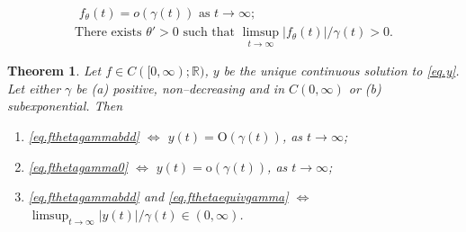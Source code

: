 \documentclass[a4paper,10pt,reqno]{amsart}
\numberwithin{equation}{section}
\newtheorem{theorem}{Theorem}
\theoremstyle{definition}
\theoremstyle{remark}
\DeclareMathOperator{\1}{\mathbbm 1}
\begin{document}
	\begin{gather} 
		\label{eq.fthetagamma0}
		\text{
			$f_\theta(t)=o(\gamma(t))$ as $t\to\infty$}; \\
		\label{eq.fthetaequivgamma}
		\text{There exists $\theta'>0$ such that $\limsup_{t\to\infty} |f_\theta(t)|/\gamma(t)>0$}.
	\end{gather} 
	\begin{theorem} \label{lemma.fthetaymonotone}
		Let $f\in C([0,\infty);\mathbb{R})$, $y$ be the unique continuous solution to \eqref{eq.y}. 
		Let either $\gamma$ be (a)  positive, non--decreasing and in $C(0,\infty)$ or (b) subexponential. Then 
		\begin{enumerate}
			\item[(i)] \eqref{eq.fthetagammabdd} $\Longleftrightarrow$ 
			$y(t)=\text{O}(\gamma(t))$, as $t\to\infty$;	
			\item[(ii)] \eqref{eq.fthetagamma0} $\Longleftrightarrow$
			$y(t)=\text{o}(\gamma(t))$, as $t\to\infty$;	
			\item[(iii)] \eqref{eq.fthetagammabdd} and \eqref{eq.fthetaequivgamma}  $\Longleftrightarrow$
			$\limsup_{t\to\infty} |y(t)|/\gamma(t) \in (0,\infty)$.
		\end{enumerate} 
	\end{theorem}
\end{document}

